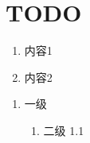 \section*{TODO}

\begin{enumerate}[label=(\alph*)]
  \item 内容1
  \item 内容2
\end{enumerate}

\begin{enumerate}[label=\arabic*., ref=\arabic*]
  \item 一级
  \begin{enumerate}[label=\arabic*., ref=\theenumi.\arabic*]
    \item 二级 1.1
  \end{enumerate}
\end{enumerate}

